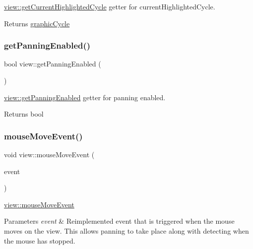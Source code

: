 \mbox{\hyperlink{classview_aa0b6bfa057ab5c4d8f3bd60557622533}{view\+::get\+Current\+Highlighted\+Cycle}} getter for current\+Highlighted\+Cycle. 

\begin{DoxyReturn}{Returns}
\mbox{\hyperlink{classgraphic_cycle}{graphic\+Cycle}} 
\end{DoxyReturn}
\mbox{\label{classview_aea81f104e17ad13b12d66dabc82b2df0}} 
\subsubsection{\texorpdfstring{get\+Panning\+Enabled()}{getPanningEnabled()}}
{\footnotesize\ttfamily bool view\+::get\+Panning\+Enabled (\begin{DoxyParamCaption}{ }\end{DoxyParamCaption})}



\mbox{\hyperlink{classview_aea81f104e17ad13b12d66dabc82b2df0}{view\+::get\+Panning\+Enabled}} getter for panning enabled. 

\begin{DoxyReturn}{Returns}
bool 
\end{DoxyReturn}
\mbox{\label{classview_a165a6cba84a12fc10fbf4c6fee73df73}} 
\subsubsection{\texorpdfstring{mouse\+Move\+Event()}{mouseMoveEvent()}}
{\footnotesize\ttfamily void view\+::mouse\+Move\+Event (\begin{DoxyParamCaption}\item[{Q\+Mouse\+Event $\ast$}]{event }\end{DoxyParamCaption})}



\mbox{\hyperlink{classview_a165a6cba84a12fc10fbf4c6fee73df73}{view\+::mouse\+Move\+Event}} 


\begin{DoxyParams}{Parameters}
{\em event} & Reimplemented event that is triggered when the mouse moves on the view. This allows panning to take place along with detecting when the mouse has stopped. \\
\hline
\end{DoxyParams}
\mbox{\label{classview_a7813d1b3e94e3c4db1ec0fa9143a1eca}} 
